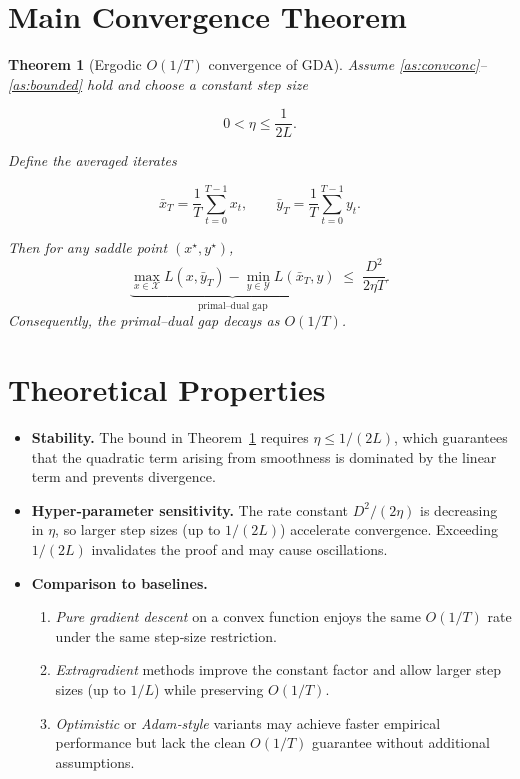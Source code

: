 \documentclass{article}
\newtheorem{theorem}{Theorem}
\begin{document}
\section*{Main Convergence Theorem}
\begin{theorem}[Ergodic $O(1/T)$ convergence of GDA]\label{thm:main}
Assume \ref{as:convconc}–\ref{as:bounded} hold and choose a constant step size  

\[
0<\eta\le\frac{1}{2L}.
\]

Define the averaged iterates  

\[
\bar x_{T}= \frac{1}{T}\sum_{t=0}^{T-1}x_{t},\qquad 
\bar y_{T}= \frac{1}{T}\sum_{t=0}^{T-1}y_{t}.
\]

Then for any saddle point $(x^{\star},y^{\star})$,
\[
\underbrace{\max_{x\in\mathcal{X}}L(x,\bar y_{T})-\min_{y\in\mathcal{Y}}L(\bar x_{T},y)}_{\displaystyle\text{primal–dual gap}}
\;\le\;
\frac{D^{2}}{2\eta T}.
\]
Consequently, the primal–dual gap decays as $O(1/T)$.
\end{theorem}

\section*{Theoretical Properties}
\begin{itemize}
\item \textbf{Stability.} The bound in Theorem~\ref{thm:main} requires $\eta\le1/(2L)$, which guarantees that the quadratic term arising from smoothness is dominated by the linear term and prevents divergence.
\item \textbf{Hyper‑parameter sensitivity.} The rate constant $D^{2}/(2\eta)$ is decreasing in $\eta$, so larger step sizes (up to $1/(2L)$) accelerate convergence. Exceeding $1/(2L)$ invalidates the proof and may cause oscillations.
\item \textbf{Comparison to baselines.}
    \begin{enumerate}
        \item \emph{Pure gradient descent} on a convex function enjoys the same $O(1/T)$ rate under the same step‑size restriction.
        \item \emph{Extragradient} methods improve the constant factor and allow larger step sizes (up to $1/L$) while preserving $O(1/T)$.
        \item \emph{Optimistic} or \emph{Adam‑style} variants may achieve faster empirical performance but lack the clean $O(1/T)$ guarantee without additional assumptions.
    \end{enumerate}
\end{itemize}
\end{document}
